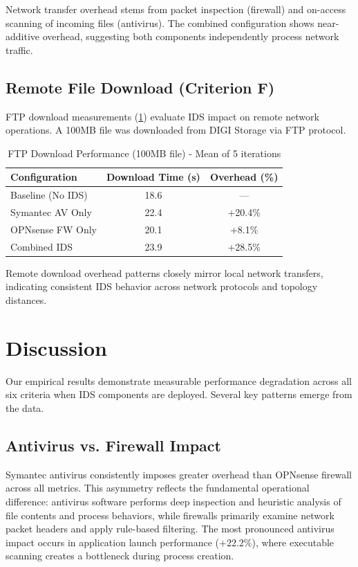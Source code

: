 \documentclass[runningheads,a4paper,english]{llncs}[2022/01/12]
\begin{document}
Network transfer overhead stems from packet inspection (firewall) and on-access scanning of incoming files (antivirus). The combined configuration shows near-additive overhead, suggesting both components independently process network traffic.

\subsection{Remote File Download (Criterion F)}

FTP download measurements (\cref{tab:ftp}) evaluate IDS impact on remote network operations. A 100MB file was downloaded from DIGI Storage via FTP protocol.

\begin{table}
  \caption{FTP Download Performance (100MB file) - Mean of 5 iterations}
  \label{tab:ftp}
  \centering
  \begin{tabular}{lcc}
    \toprule
    Configuration & Download Time (s) & Overhead (\%) \\
    \midrule
    Baseline (No IDS) & 18.6 & --- \\
    Symantec AV Only & 22.4 & +20.4\% \\
    OPNsense FW Only & 20.1 & +8.1\% \\
    Combined IDS & 23.9 & +28.5\% \\
    \bottomrule
  \end{tabular}
\end{table}

Remote download overhead patterns closely mirror local network transfers, indicating consistent IDS behavior across network protocols and topology distances.

\section{Discussion}
\label{sec:discussion}

Our empirical results demonstrate measurable performance degradation across all six criteria when IDS components are deployed. Several key patterns emerge from the data.

\subsection{Antivirus vs. Firewall Impact}

Symantec antivirus consistently imposes greater overhead than OPNsense firewall across all metrics. This asymmetry reflects the fundamental operational difference: antivirus software performs deep inspection and heuristic analysis of file contents and process behaviors, while firewalls primarily examine network packet headers and apply rule-based filtering. The most pronounced antivirus impact occurs in application launch performance (+22.2\%), where executable scanning creates a bottleneck during process creation.
\end{document}
